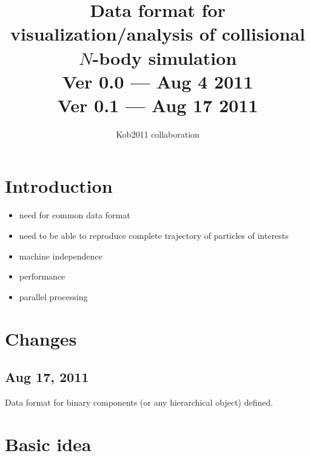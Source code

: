 \documentclass[12pt]{article}
\begin{document}
\def\bx{{\bf x}}
\def\bv{{\bf v}}
\def\ba{{\bf a}}
\def\badot{{\bf \dot{a}}}
\def\batwodot{{\bf a}^{(2)}}
\def\bathreedot{{\bf a}^{(3)}}
\def\bj{{\bf j}}
\def\dt{{\Delta t}}
\def\comment#1{}
\def\sub#1{_{\rm #1}}
\def\sup#1{^{\rm #1}}
\def\APJ{{\it Ap. J. }}
\def\APJL{{\it Ap. J. Lett. }}


\title{Data format for visualization/analysis of collisional $N$-body simulation\\
{\large 
Ver 0.0 --- Aug 4 2011\\
Ver 0.1 --- Aug 17 2011\\
}
}
\author{Kob2011 collaboration}
\maketitle

\tableofcontents

\newpage

\thispagestyle{empty}




\section{Introduction}

\begin{itemize}

  \item need for common data format
  \item need to be able to reproduce complete trajectory of particles
    of interests
  \item machine independence
  \item performance
  \item parallel processing
\end{itemize}

\section{Changes}
\subsection{Aug 17, 2011}

Data format for binary components (or any hierarchical object)
defined.


\section{Basic idea}
\end{document}
